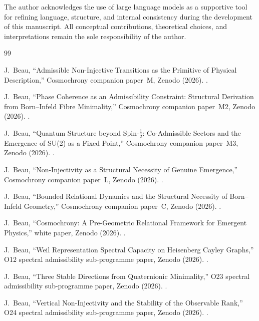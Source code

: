 \documentclass[11pt,a4paper]{article}
\begin{document}
  The author acknowledges the use of large language models as a supportive tool
  for refining language, structure, and internal consistency during the development
  of this manuscript.
  All conceptual contributions, theoretical choices, and interpretations remain
  the sole responsibility of the author.

  \begin{thebibliography}{99}

    J.~Beau,
    ``Admissible Non-Injective Transitions as the Primitive of Physical Description,''
    Cosmochrony companion paper~M, Zenodo (2026).
    .

    J.~Beau,
    ``Phase Coherence as an Admissibility Constraint:
    Structural Derivation from Born--Infeld Fibre Minimality,''
    Cosmochrony companion paper~M2, Zenodo (2026).
    .

    J.~Beau,
    ``Quantum Structure beyond Spin-$\tfrac{1}{2}$:
    Co-Admissible Sectors and the Emergence of SU(2) as a Fixed Point,''
    Cosmochrony companion paper~M3, Zenodo (2026).
    .

    J.~Beau,
    ``Non-Injectivity as a Structural Necessity of Genuine Emergence,''
    Cosmochrony companion paper~L, Zenodo (2026).
    .

    J.~Beau,
    ``Bounded Relational Dynamics and the Structural Necessity of Born--Infeld Geometry,''
    Cosmochrony companion paper~C, Zenodo (2026).
    .

    J.~Beau,
    ``Cosmochrony: A Pre-Geometric Relational Framework for Emergent Physics,''
    white paper, Zenodo (2026).
    .

    J.~Beau,
    ``Weil Representation Spectral Capacity on Heisenberg Cayley Graphs,''
    O12 spectral admissibility sub-programme paper, Zenodo (2026).
    .

    J.~Beau,
    ``Three Stable Directions from Quaternionic Minimality,''
    O23 spectral admissibility sub-programme paper, Zenodo (2026).
    .

    J.~Beau,
    ``Vertical Non-Injectivity and the Stability of the Observable Rank,''
    O24 spectral admissibility sub-programme paper, Zenodo (2026).
    .

  \end{thebibliography}
\end{document}
